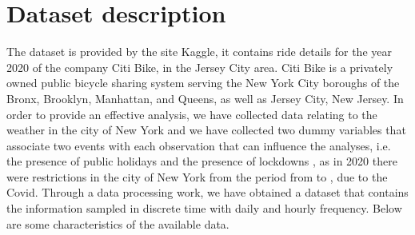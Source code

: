 \section{Dataset description}
The dataset is provided by the site Kaggle, it contains ride details for the year 2020 of the company Citi Bike, in the Jersey City area. Citi Bike is a privately owned public bicycle sharing system serving the New York City boroughs of the Bronx, Brooklyn, Manhattan, and Queens, as well as Jersey City, New Jersey. In order to provide an effective analysis, we have collected data relating to the weather in the city of New York and we have collected two dummy variables that associate two events with each observation that can influence the analyses, i.e. the presence of public holidays and the presence of lockdowns , as in 2020 there were restrictions in the city of New York from the period from to , due to the Covid.
Through a data processing work, we have obtained a dataset that contains the information sampled in discrete time with daily and hourly frequency. Below are some characteristics of the available data.
